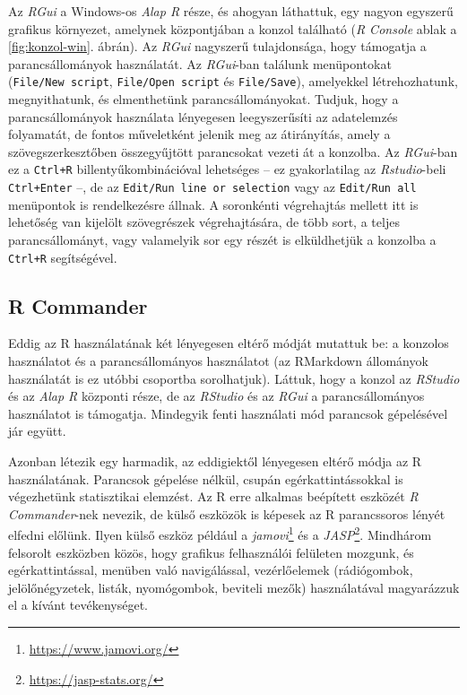 \documentclass[
]{book}
\DeclareRobustCommand{\href}[2]{#2\footnote{\url{#1}}}
\renewcommand{\href}[2]{#2\footnote{\url{#1}}}
\begin{document}
Az \emph{RGui} a Windows-os \emph{Alap R} része, és ahogyan láthattuk, egy nagyon egyszerű grafikus környezet, amelynek központjában a konzol található (\emph{R Console} ablak a \ref{fig:konzol-win}. ábrán). Az \emph{RGui} nagyszerű tulajdonsága, hogy támogatja a parancsállományok használatát. Az \emph{RGui}-ban találunk menüpontokat (\texttt{File/New\ script}, \texttt{File/Open\ script} és \texttt{File/Save}), amelyekkel létrehozhatunk, megnyithatunk, és elmenthetünk parancsállományokat. Tudjuk, hogy a parancsállományok használata lényegesen leegyszerűsíti az adatelemzés folyamatát, de fontos műveletként jelenik meg az átirányítás, amely a szövegszerkesztőben összegyűjtött parancsokat vezeti át a konzolba. Az \emph{RGui}-ban ez a \texttt{Ctrl+R} billentyűkombinációval lehetséges -- ez gyakorlatilag az \emph{Rstudio}-beli \texttt{Ctrl+Enter} --, de az \texttt{Edit/Run\ line\ or\ selection} vagy az \texttt{Edit/Run\ all} menüpontok is rendelkezésre állnak. A soronkénti végrehajtás mellett itt is lehetőség van kijelölt szövegrészek végrehajtására, de több sort, a teljes parancsállományt, vagy valamelyik sor egy részét is elküldhetjük a konzolba a \texttt{Ctrl+R} segítségével.

\hypertarget{r-commander}{%
\subsection{R Commander}\label{r-commander}}

Eddig az R használatának két lényegesen eltérő módját mutattuk be: a konzolos használatot és a parancsállományos használatot (az RMarkdown állományok használatát is ez utóbbi csoportba sorolhatjuk). Láttuk, hogy a konzol az \emph{RStudio} és az \emph{Alap R} központi része, de az \emph{RStudio} és az \emph{RGui} a parancsállományos használatot is támogatja. Mindegyik fenti használati mód parancsok gépelésével jár együtt.

Azonban létezik egy harmadik, az eddigiektől lényegesen eltérő módja az R használatának. Parancsok gépelése nélkül, csupán egérkattintássokkal is végezhetünk statisztikai elemzést. Az R erre alkalmas beépített eszközét \emph{R Commander}-nek nevezik, de külső eszközök is képesek az R parancssoros lényét elfedni előlünk. Ilyen külső eszköz például a \href{https://www.jamovi.org/}{\emph{jamovi}} és a \href{https://jasp-stats.org/}{\emph{JASP}}. Mindhárom felsorolt eszközben közös, hogy grafikus felhasználói felületen mozgunk, és egérkattintással, menüben való navigálással, vezérlőelemek (rádiógombok, jelölőnégyzetek, listák, nyomógombok, beviteli mezők) használatával magyarázzuk el a kívánt tevékenységet.
\end{document}
